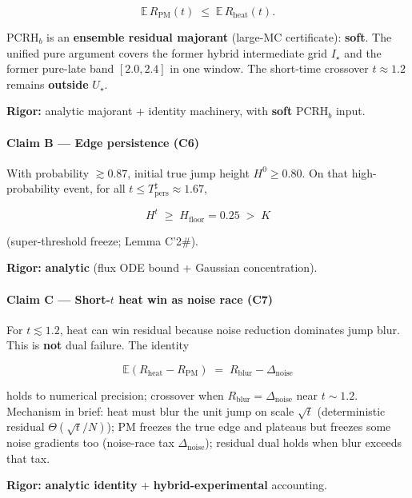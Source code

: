 \documentclass[
  11pt,
]{article}
\begin{document}
\[
\mathbb{E}\,R_{\mathrm{PM}}(t) \;\le\; \mathbb{E}\,R_{\mathrm{heat}}(t).
\]

PCRH\(_b\) is an \textbf{ensemble residual majorant} (large-MC
certificate): \textbf{soft}. The unified pure argument covers the former
hybrid intermediate grid \(I_\star\) and the former pure-late band
\([2.0,2.4]\) in one window. The short-time crossover \(t\approx 1.2\)
remains \textbf{outside} \(U_\star\).

\textbf{Rigor:} analytic majorant + identity machinery, with
\textbf{soft} PCRH\(_b\) input.

\paragraph{\texorpdfstring{Claim B --- Edge persistence
(\textbf{C6})}{Claim B --- Edge persistence (C6)}}\label{claim-b-edge-persistence-c6}

With probability \(\gtrsim 0.87\), initial true jump height
\(H^0\ge 0.80\). On that high-probability event, for all
\(t\le T_{\mathrm{pers}}^\sharp\approx 1.67\),

\[
H^t \;\ge\; H_{\mathrm{floor}}=0.25 \;>\; K
\]

(super-threshold freeze; Lemma C'2\#).

\textbf{Rigor:} \textbf{analytic} (flux ODE bound + Gaussian
concentration).

\paragraph{\texorpdfstring{Claim C --- Short-\(t\) heat win as noise
race
(\textbf{C7})}{Claim C --- Short-t heat win as noise race (C7)}}\label{claim-c-short-t-heat-win-as-noise-race-c7}

For \(t\lesssim 1.2\), heat can win residual because noise reduction
dominates jump blur. This is \textbf{not} dual failure. The identity

\[
\mathbb{E}(R_{\mathrm{heat}}-R_{\mathrm{PM}}) \;=\; R_{\mathrm{blur}}-\Delta_{\mathrm{noise}}
\]

holds to numerical precision; crossover when
\(R_{\mathrm{blur}}=\Delta_{\mathrm{noise}}\) near \(t\sim 1.2\).
Mechanism in brief: heat must blur the unit jump on scale \(\sqrt{t}\)
(deterministic residual \(\Theta(\sqrt{t}/N)\)); PM freezes the true
edge and plateaus but freezes some noise gradients too (noise-race tax
\(\Delta_{\mathrm{noise}}\)); residual dual holds when blur exceeds that
tax.

\textbf{Rigor:} \textbf{analytic identity} +
\textbf{hybrid-experimental} accounting.
\end{document}
